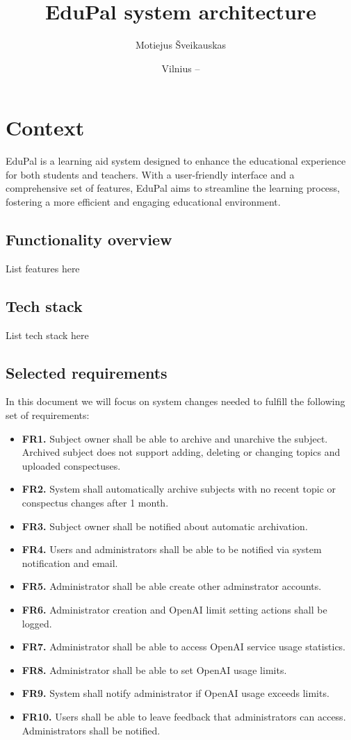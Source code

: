 \documentclass[
    english, %
]{VUMIFPSkursinis}
\title{EduPal system architecture}
\author{Motiejus Šveikauskas}
\date{Vilnius – \the\year}
\begin{document}
\maketitle

\tableofcontents

\section{Context}
EduPal is a learning aid system designed to enhance
the educational experience for both students and teachers. With a user-friendly interface and a comprehensive set of features, EduPal aims to streamline the learning process, fostering a more efficient and engaging educational environment.

\subsection{Functionality overview}
List features here

\subsection{Tech stack}
List tech stack here

\subsection{Selected requirements}
In this document we will focus on system changes needed to fulfill the following set of requirements:

\begin{itemize}
    \item \textbf{FR1.} Subject owner shall be able to archive and unarchive the subject. Archived subject does not support adding, deleting or changing topics and uploaded conspectuses.
    \item \textbf{FR2.} System shall automatically archive subjects with no recent topic or conspectus changes after 1 month.
    \item \textbf{FR3.} Subject owner shall be notified about automatic archivation.
    \item \textbf{FR4.} Users and administrators shall be able to be notified via system notification and email.
    \item \textbf{FR5.} Administrator shall be able create other adminstrator accounts.
    \item \textbf{FR6.} Administrator creation and OpenAI limit setting actions shall be logged.
    \item \textbf{FR7.} Administrator shall be able to access OpenAI service usage statistics.
    \item \textbf{FR8.} Administrator shall be able to set OpenAI usage limits.
    \item \textbf{FR9.} System shall notify administrator if OpenAI usage exceeds limits.
    \item \textbf{FR10.} Users shall be able to leave feedback that administrators can access. Administrators shall be notified.
\end{itemize}
\end{document}
